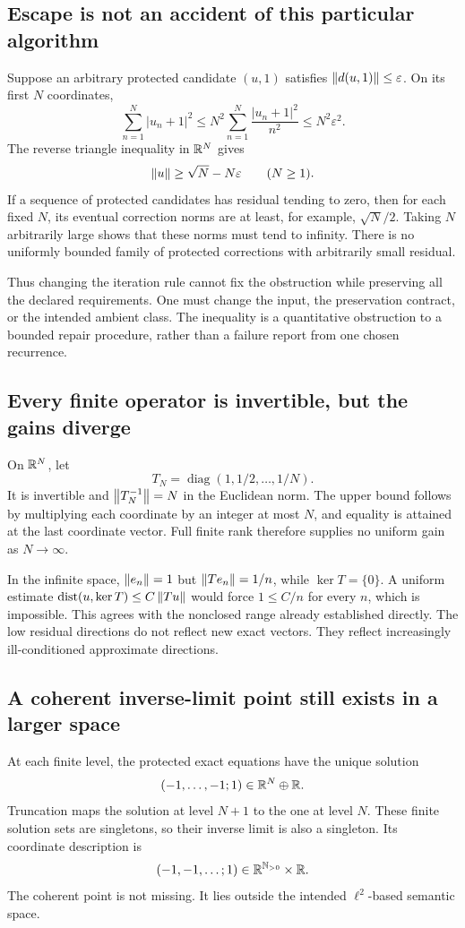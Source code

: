 \subsection{Escape is not an accident of this particular algorithm}
Suppose an arbitrary protected candidate \((u,1)\) satisfies \(\left\lVert d(u,1)\right\rVert\le\varepsilon\). On its first \(N\) coordinates,
\[
 \sum_{n=1}^{N}|u_n+1|^2
 \le N^2\sum_{n=1}^{N}\frac{|u_n+1|^2}{n^2}
 \le N^2\varepsilon^2.
\]
The reverse triangle inequality in \(\mathbb R^N\) gives
\begin{equation}\label{KS:eq:escape-necessity}
 \left\lVert u\right\rVert\ge\sqrt N-N\varepsilon\qquad(N\ge1).
\end{equation}
If a sequence of protected candidates has residual tending to zero, then for each fixed \(N\), its eventual correction norms are at least, for example, \(\sqrt N/2\). Taking \(N\) arbitrarily large shows that these norms must tend to infinity. There is no uniformly bounded family of protected corrections with arbitrarily small residual.

Thus changing the iteration rule cannot fix the obstruction while preserving all the declared requirements. One must change the input, the preservation contract, or the intended ambient class. The inequality is a quantitative obstruction to a bounded repair procedure, rather than a failure report from one chosen recurrence.

\subsection{Every finite operator is invertible, but the gains diverge}
On \(\mathbb R^N\), let
\[
 T_N=\operatorname{diag}(1,1/2,\ldots,1/N).
\]
It is invertible and \(\left\lVert T_N^{-1}\right\rVert=N\) in the Euclidean norm. The upper bound follows by multiplying each coordinate by an integer at most \(N\), and equality is attained at the last coordinate vector. Full finite rank therefore supplies no uniform gain as \(N\to\infty\).

In the infinite space, \(\left\lVert e_n\right\rVert=1\) but \(\left\lVert Te_n\right\rVert=1/n\), while \(\ker T=\{0\}\). A uniform estimate
\(\operatorname{dist}(u,\ker T)\le C\left\lVert Tu\right\rVert\) would force \(1\le C/n\) for every \(n\), which is impossible. This agrees with the nonclosed range already established directly. The low residual directions do not reflect new exact vectors. They reflect increasingly ill-conditioned approximate directions.

\subsection{A coherent inverse-limit point still exists in a larger space}
At each finite level, the protected exact equations have the unique solution
\[
 (-1,\ldots,-1;1)\in\mathbb R^N\oplus\mathbb R.
\]
Truncation maps the solution at level \(N+1\) to the one at level \(N\). These finite solution sets are singletons, so their inverse limit is also a singleton. Its coordinate description is
\[
 (-1,-1,\ldots;1)\in\mathbb R^{\mathbb N_{>0}}\times\mathbb R.
\]
The coherent point is not missing. It lies outside the intended \(\ell^2\)-based semantic space.


